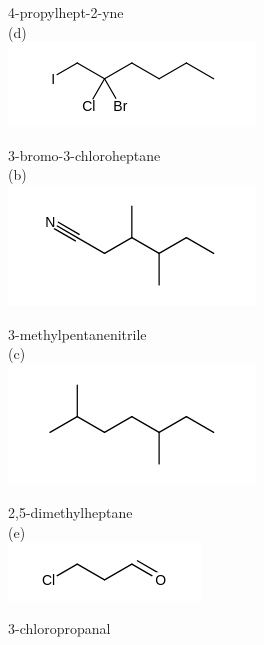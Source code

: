 \documentclass[10pt]{article}
\begin{document}
4-propylhept-2-yne\\
(d)\\
\includegraphics{smile-57efa3bd88ab55dd7bbee72dff965d794cd6ffbc}

3-bromo-3-chloroheptane\\
(b)\\
\includegraphics{smile-979960d787d57cf6d78c7cddb4b4244e11be7d2a}

3-methylpentanenitrile\\
(c)\\
\includegraphics{smile-8f50677cc7825ad6e8f096b9447ccf92de143150}

2,5-dimethylheptane\\
(e)\\
\includegraphics{smile-1a15fe875a2b002379b11b2eed4188b45fc5b6e6}

3-chloropropanal
\end{document}
